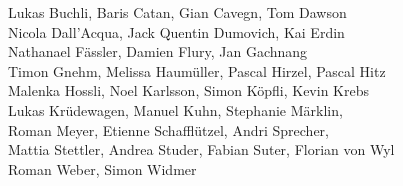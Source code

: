 %
%
%
Lukas Buchli,		%
Baris Catan,		%
Gian Cavegn,		%
Tom Dawson%
\\
Nicola Dall'Acqua,	%
Jack Quentin Dumovich,	%
Kai Erdin%
\\
Nathanael Fässler,	%
Damien Flury,		%
Jan Gachnang%
\\
Timon Gnehm,		%
Melissa Haumüller,	%
Pascal Hirzel,		%
Pascal Hitz%
\\
Malenka Hossli,		%
Noel Karlsson,		%
Simon Köpfli,		%
Kevin Krebs%
\\
Lukas Krüdewagen,	%
Manuel Kuhn,		%
Stephanie Märklin,	%
\\
Roman Meyer,		%
Etienne Schafflützel,	%
Andri Sprecher,		%
\\
Mattia Stettler,	%
Andrea Studer,		%
Fabian Suter,		%
Florian von Wyl%
\\
Roman Weber,		%
Simon Widmer%
